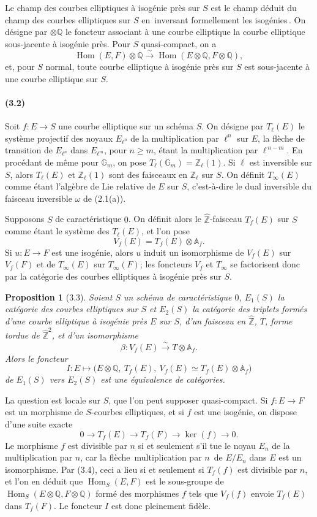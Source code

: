 \documentclass[10pt]{article}
\newcommand{\Af}{\mathbb A_f}
\newcommand{\Q}{\mathbb Q}
\newcommand{\Z}{\mathbb Z}
\newcommand{\bZ}{\widehat{\mathbb Z}}
\newcommand{\Gm}{\mathbb G_m}
\newcommand{\Hom}{\operatorname{Hom}}
\newcommand{\frquote}[1]{\guillemotleft{}\,#1\,\guillemotright{}}
\newtheorem*{proposition}{Proposition}
\begin{document}
Le champ des courbes elliptiques à isogénie près sur $S$ est le champ déduit du
champ des courbes elliptiques sur $S$ en \frquote{inversant formellement les isogénies}. On désigne
par $\otimes\Q$ le foncteur associant à une courbe elliptique la courbe elliptique sous-jacente
à isogénie près. Pour $S$ quasi-compact, on a
\[
\Hom(E,F)\otimes\Q\xrightarrow{\sim}\Hom(E\otimes\Q,F\otimes\Q),
\]
et, pour $S$ normal, toute courbe elliptique à isogénie près sur $S$ est sous-jacente à une
courbe elliptique sur $S$.

\paragraph{(3.2)}
Soit $f:E\to S$ une courbe elliptique sur un schéma $S$. On désigne par $T_\ell(E)$ le système
projectif des noyaux $E_{\ell^n}$ de la multiplication par $\ell^n$ sur $E$, la flèche
de transition de $E_{\ell^n}$ dans $E_{\ell^m}$, pour $n\ge m$, étant la multiplication par
$\ell^{\,n-m}$. En procédant de même pour $\Gm$, on pose $T_\ell(\Gm)=\Z_\ell(1)$.
Si $\ell$ est inversible sur $S$, alors $T_\ell(E)$ et $\Z_\ell(1)$ sont des faisceaux en
$\Z_\ell$ sur $S$. On définit $T_\infty(E)$ comme étant l'algèbre de Lie relative de $E$ sur
$S$, c'est-à-dire le dual inversible du faisceau inversible $\omega$ de (2.1(a)).

Supposons $S$ de caractéristique $0$. On définit alors le $\bZ$-faisceau $T_f(E)$
sur $S$ comme étant le système des $T_\ell(E)$, et l'on pose
\[
V_f(E)=T_f(E)\otimes \Af.
\]
Si $u:E\to F$ est une isogénie, alors $u$ induit un isomorphisme de $V_f(E)$ sur $V_f(F)$
et de $T_\infty(E)$ sur $T_\infty(F)$; les foncteurs $V_f$ et $T_\infty$ se factorisent donc
par la catégorie des courbes elliptiques à isogénie près sur $S$.

\begin{proposition}[3.3]
Soient $S$ un schéma de caractéristique $0$, $E_1(S)$ la catégorie des courbes elliptiques
sur $S$ et $E_2(S)$ la catégorie des triplets formés d'une courbe elliptique à
isogénie près $E$ sur $S$, d'un faisceau en $\bZ$, $T$, forme tordue de $\bZ^2$, et d'un
isomorphisme
\[
\beta:V_f(E)\xrightarrow{\sim}T\otimes\Af.
\]
Alors le foncteur
\[
I:E\longmapsto \bigl(E\otimes\Q,\ T_f(E),\ V_f(E)\simeq T_f(E)\otimes\Af\bigr)
\]
de $E_1(S)$ vers $E_2(S)$ est une équivalence de catégories.
\end{proposition}

La question est locale sur $S$, que l'on peut supposer quasi-compact. Si $f:E\to F$ est
un morphisme de $S$-courbes elliptiques, et si $f$ est une isogénie, on dispose d'une suite
exacte
\[
0\to T_f(E)\to T_f(F)\to \ker(f)\to 0.
\tag{3.4}
\]
Le morphisme $f$ est divisible par $n$ si et seulement s'il tue le noyau $E_n$ de la
multiplication par $n$, car la flèche \frquote{multiplication par $n$} de $E/E_n$ dans $E$ est un
isomorphisme. Par (3.4), ceci a lieu si et seulement si $T_f(f)$ est divisible par $n$,
et l'on en déduit que $\Hom_S(E,F)$ est le sous-groupe de $\Hom_S(E\otimes\Q,F\otimes\Q)$
formé des morphismes $f$ tels que $V_f(f)$ envoie $T_f(E)$ dans $T_f(F)$. Le foncteur
$I$ est donc pleinement fidèle.
\end{document}
